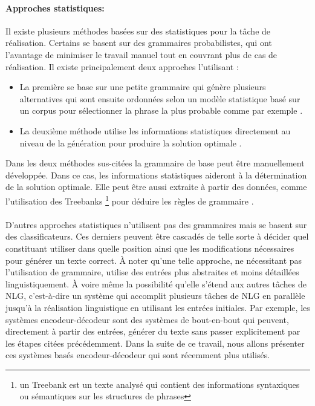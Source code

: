 \paragraph{Approches statistiques:} Il existe plusieurs méthodes basées sur des statistiques pour la tâche de réalisation. Certains se basent sur des grammaires probabilistes, qui ont l'avantage de minimiser le travail manuel tout en couvrant plus de cas de réalisation. Il existe principalement deux approches l'utilisant \citep{Gatt2018}:
\begin{itemize}
	\item La première se base sur une petite grammaire qui génère plusieurs alternatives qui sont ensuite ordonnées selon un modèle statistique basé sur un corpus pour sélectionner la phrase la plus probable comme par exemple \citep{LangkildeGeary2000}.
	\item La deuxième méthode utilise les informations statistiques directement au niveau de la génération pour produire la solution optimale \citep{Belz2008}.
\end{itemize}
Dans les deux méthodes sus-citées la grammaire de base peut être manuellement développée. Dans ce cas, les informations statistiques aideront à la détermination de la solution optimale. Elle peut être aussi extraite à partir des données, comme l'utilisation des Treebanks \footnote{un Treebank est un texte analysé qui contient des informations syntaxiques ou sémantiques sur les structures de phrases} pour déduire les règles de grammaire \citep{Espinosa2008}.
\paragraph{}
D'autres approches statistiques n'utilisent pas des grammaires mais se basent sur des classificateurs. Ces derniers peuvent être cascadés de telle sorte à décider quel constituant utiliser dans quelle position ainsi que les modifications nécessaires pour générer un texte correct. À noter qu'une telle approche, ne nécessitant pas l'utilisation de grammaire, utilise des entrées plus abstraites et moins détaillées linguistiquement. À voire même la possibilité qu'elle s'étend aux autres tâches de NLG, c'est-à-dire un système qui accomplit plusieurs tâches de NLG en parallèle jusqu'à la réalisation linguistique en utilisant les entrées initiales. Par exemple, les systèmes encodeur-décodeur sont des systèmes de bout-en-bout qui peuvent, directement à partir des entrées, générer du texte sans passer explicitement par les étapes citées précédemment. Dans la suite de ce travail, nous allons présenter ces systèmes basés encodeur-décodeur qui sont récemment plus utilisés.

